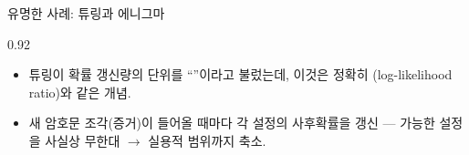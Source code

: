 \begin{frame}{유명한 사례: 튜링과 에니그마}
\begin{center}\begin{varwidth}{0.92\textwidth}
  \begin{itemize}
    
    \item 튜링이 확률 갱신량의 단위를 ``''이라고 불렀는데,
      이것은 정확히 (log-likelihood ratio)와 같은 개념.
    \item 새 암호문 조각(증거)이 들어올 때마다 각 설정의 사후확률을
      갱신 --- 가능한 설정을 사실상 무한대 $\to$ 실용적 범위까지 축소.
    
  \end{itemize}
\end{varwidth}\end{center}
\end{frame}
